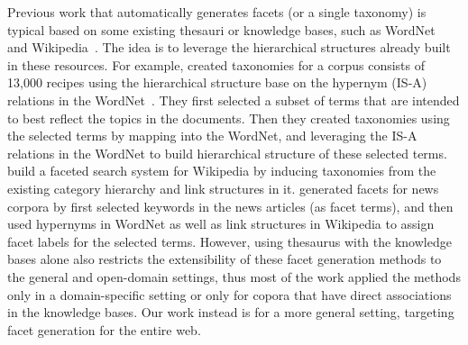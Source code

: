 Previous work that automatically generates facets (or a single taxonomy) is typical based on some existing thesauri or knowledge bases, such as WordNet~\cite{stoica2007automating,dakka2005automatic,dakka2008automatic,latha2010afgf} and Wikipedia~\cite{dakka2008automatic,li2010facetedpedia,kohlschutter2006using}. The idea is to leverage the hierarchical structures already built in these resources. For example, \citet{stoica2007automating} created taxonomies for a corpus consists of 13,000 recipes using the hierarchical structure base on the hypernym (IS-A) relations in the WordNet~\cite{fellbaum1998wordnet}. They first selected a subset of terms that are intended to best reflect the topics in the documents. Then they created taxonomies using the selected terms by mapping into the WordNet, and leveraging the IS-A relations in the WordNet to build hierarchical structure of these selected terms. \citet{li2010facetedpedia} build a faceted search system for Wikipedia by inducing taxonomies from the existing 
category hierarchy and link structures in it. \citet{dakka2008automatic} generated facets for news corpora by first selected keywords in the news articles (as facet terms), and then used hypernyms in WordNet as well as link structures in Wikipedia to assign facet labels for the selected terms. However, using thesaurus with the knowledge bases alone also restricts the extensibility of these facet generation methods to the general and open-domain settings, thus most of the work applied the methods only in a domain-specific setting or only for copora that have direct associations in the knowledge bases. Our work instead is for a more general setting, targeting facet generation for the entire web.


